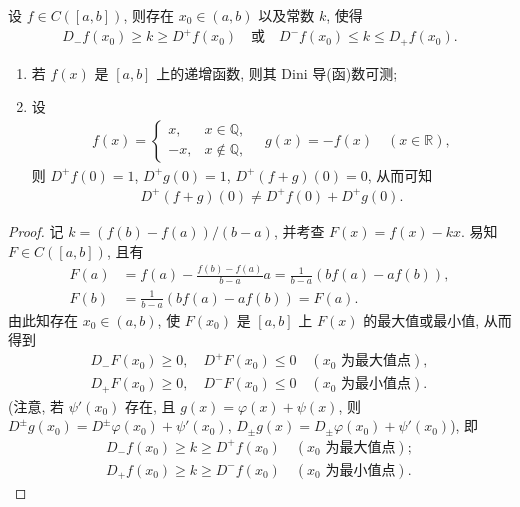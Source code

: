 \documentclass[../../main.tex]{subfiles}%
\begin{document}
\begin{example}
设 $f\in C([a,b])$, 则存在 $x_0\in(a,b)$ 以及常数 $k$, 使得
\begin{align*}
D_-f(x_0)\geqslant k\geqslant D^+f(x_0) \quad \text{或} \quad D^-f(x_0)\leqslant k\leqslant D_+f(x_0).
\end{align*}
\end{example}
\begin{remark}
\begin{enumerate}[(1)]
\item 若 $f(x)$ 是 $[a,b]$ 上的递增函数, 则其 Dini 导(函)数可测;
\item 设
\begin{align*}
f(x) =
\begin{cases}
x, & x\in\mathbb{Q}, \\
-x, & x\notin \mathbb{Q},
\end{cases}
\quad g(x) = -f(x) \quad (x\in\mathbb{R}),
\end{align*}
则 $D^+f(0)=1$, $D^+g(0)=1$, $D^+(f+g)(0)=0$, 从而可知
\begin{align*}
D^+(f+g)(0)\neq D^+f(0)+D^+g(0).
\end{align*}
\end{enumerate}
\end{remark}
\begin{proof}
记 $k=(f(b)-f(a))/(b-a)$, 并考查 $F(x)=f(x)-kx$. 易知 $F\in C([a,b])$, 且有
\begin{align*}
F(a) &= f(a)-\frac{f(b)-f(a)}{b-a}a = \frac{1}{b-a}(bf(a)-af(b)), \\
F(b) &= \frac{1}{b-a}(bf(a)-af(b)) = F(a).
\end{align*}
由此知存在 $x_0\in(a,b)$, 使 $F(x_0)$ 是 $[a,b]$ 上 $F(x)$ 的最大值或最小值, 从而得到
\begin{align*}
D_-F(x_0)\geqslant 0,\quad D^+F(x_0)\leqslant 0 \quad (x_0 \text{ 为最大值点}), \\
D_+F(x_0)\geqslant 0,\quad D^-F(x_0)\leqslant 0 \quad (x_0 \text{ 为最小值点}).
\end{align*}
(注意, 若 $\psi'(x_0)$ 存在, 且 $g(x)=\varphi(x)+\psi(x)$, 则 $D^\pm g(x_0)=D^\pm\varphi(x_0)+\psi'(x_0)$, $D_\pm g(x)=D_\pm\varphi(x_0)+\psi'(x_0)$), 即
\begin{align*}
D_-f(x_0)\geqslant k\geqslant D^+f(x_0) \quad (x_0 \text{ 为最大值点}); \\
D_+f(x_0)\geqslant k\geqslant D^-f(x_0) \quad (x_0 \text{ 为最小值点}).
\end{align*}
\end{proof}
\end{document}
